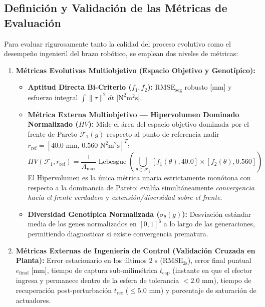 \documentclass[11pt,a4paper]{article}
\begin{document}
\subsection{Definición y Validación de las Métricas de Evaluación}
Para evaluar rigurosamente tanto la calidad del proceso evolutivo como el desempeño ingenieril del brazo robótico, se emplean dos niveles de métricas:
\begin{enumerate}
    \item \textbf{Métricas Evolutivas Multiobjetivo (Espacio Objetivo y Genotípico):}
    \begin{itemize}
        \item \textbf{Aptitud Directa Bi-Criterio ($f_1, f_2$):} $\text{RMSE}_{\text{seg}}$ robusto [mm] y esfuerzo integral $\int \|\tau\|^2 dt$ [$\text{N}^2\text{m}^2\text{s}$].
        \item \textbf{Métrica Externa Multiobjetivo — Hipervolumen Dominado Normalizado ($HV$):} Mide el área del espacio objetivo dominada por el frente de Pareto $\mathcal{F}_1(g)$ respecto al punto de referencia nadir $r_{\text{ref}} = [40.0\text{ mm},\, 0.560\text{ N}^2\text{m}^2\text{s}]^T$:
        \begin{equation}
            HV(\mathcal{F}_1, r_{\text{ref}}) = \frac{1}{A_{\max}} \operatorname{Lebesgue}\left( \bigcup_{\theta \in \mathcal{F}_1} [f_1(\theta), 40.0] \times [f_2(\theta), 0.560] \right)
        \end{equation}
        El Hipervolumen es la única métrica unaria estrictamente monótona con respecto a la dominancia de Pareto: evalúa simultáneamente \textit{convergencia hacia el frente verdadero} y \textit{extensión/diversidad sobre el frente}.
        \item \textbf{Diversidad Genotípica Normalizada ($\sigma_\theta(g)$):} Desviación estándar media de los genes normalizados en $[0, 1]^6$ a lo largo de las generaciones, permitiendo diagnosticar si existe convergencia prematura.
    \end{itemize}
    \item \textbf{Métricas Externas de Ingeniería de Control (Validación Cruzada en Planta):} Error estacionario en los últimos $2\text{ s}$ ($\text{RMSE}_{2\text{s}}$), error final puntual $e_{\text{final}}$ [mm], tiempo de captura sub-milimétrica $t_{\text{cap}}$ (instante en que el efector ingresa y permanece dentro de la esfera de tolerancia $< 2.0\text{ mm}$), tiempo de recuperación post-perturbación $t_{\text{rec}}$ ($\le 5.0\text{ mm}$) y porcentaje de saturación de actuadores.
\end{enumerate}
\end{document}
